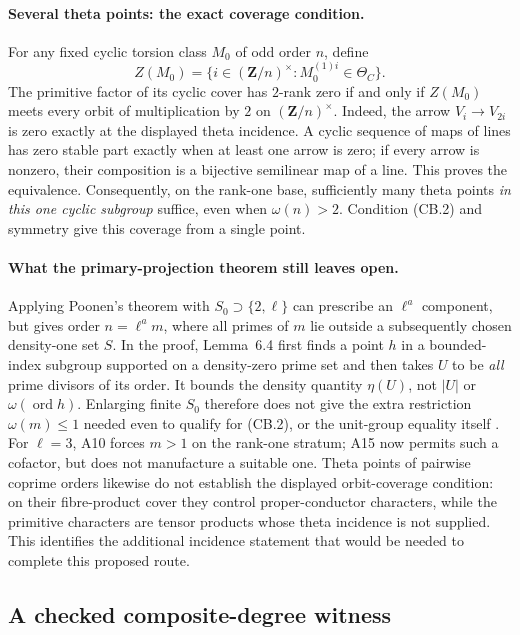 \documentclass[11pt,a4paper]{article}
\begin{document}
\paragraph{Several theta points: the exact coverage condition.}
For any fixed cyclic torsion class $M_0$ of odd order $n$, define
\[
 Z(M_0)=\{i\in(\mathbf Z/n)^\times:
                    M_0^{(1)i}\in\Theta_C\}.
\]
The primitive factor of its cyclic cover has $2$-rank zero if and
only if $Z(M_0)$ meets every orbit of multiplication by $2$ on
$(\mathbf Z/n)^\times$. Indeed, the arrow $V_i\to V_{2i}$ is
zero exactly at the displayed theta incidence. A cyclic sequence
of maps of lines has zero stable part exactly when at least one
arrow is zero; if every arrow is nonzero, their composition is a
bijective semilinear map of a line. This proves the equivalence.
Consequently, on the rank-one base, sufficiently many theta points
\emph{in this one cyclic subgroup} suffice, even when $\omega(n)>2$.
Condition (CB.2) and symmetry give this coverage from a single point.

\paragraph{What the primary-projection theorem still leaves open.}
Applying Poonen's theorem with $S_0\supset\{2,\ell\}$ can prescribe
an $\ell^a$ component, but gives order $n=\ell^a m$, where all primes
of $m$ lie outside a subsequently chosen density-one set $S$.
In the proof, Lemma~6.4 first finds a point $h$ in a bounded-index
subgroup supported on a density-zero prime set and then takes
$U$ to be \emph{all} prime divisors of its order. It bounds the
density quantity $\eta(U)$, not $|U|$ or $\omega(\operatorname{ord}h)$.
Enlarging finite $S_0$ therefore does not give the extra restriction
$\omega(m)\le1$ needed even to qualify for (CB.2), or the unit-group
equality itself \cite[Theorem~1.8 and Lemmas~6.4--6.6]{Poonen2005}.
For $\ell=3$, A10 forces $m>1$ on the rank-one stratum; A15 now
permits such a cofactor, but does not manufacture a suitable one.
Theta points of pairwise coprime orders likewise do not establish
the displayed orbit-coverage condition: on their fibre-product
cover they control proper-conductor characters, while the primitive
characters are tensor products whose theta incidence is not supplied.
This identifies the additional incidence statement that would be
needed to complete this proposed route.


\subsection{A checked composite-degree witness}
\end{document}
